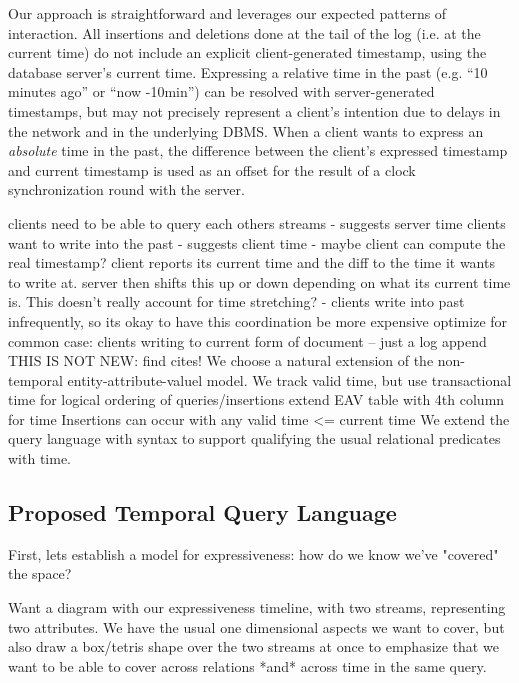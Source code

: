 Our approach is straightforward and leverages our expected patterns of interaction.
All insertions and deletions done at the tail of the log (i.e. at the current time)
do not include an explicit client-generated timestamp, using the database server's current
time. Expressing a relative time in the past (e.g. ``10 minutes ago'' or ``now -10min'')
can be resolved with server-generated timestamps, but may not precisely represent
a client's intention due to delays in the network and in the underlying DBMS. 
When a client wants to express an \emph{absolute} time in the past, the difference
between the client's expressed timestamp and current timestamp is used as an offset
for the result of a clock synchronization round with the server.

clients need to be able to query each others streams
    - suggests server time
clients want to write into the past
    - suggests client time
    - maybe client can compute the real timestamp?
        client reports its current time and the diff to the time it wants to write at.
        server then shifts this up or down depending on what its current time is.
        This doesn't really account for time stretching?
    - clients write into past infrequently, so its okay to have this coordination be more expensive
optimize for common case: clients writing to current form of document -- just a log append
\fi
{}
THIS IS NOT NEW: find cites!
We choose a natural extension of the non-temporal entity-attribute-valuel model.
We track valid time, but use transactional time for logical ordering of queries/insertions
extend EAV table with 4th column for time
Insertions can occur with any valid time <= current time
We extend the query language with syntax to support qualifying the usual
relational predicates with time. 
\fi

\subsection{Proposed Temporal Query Language}

First, lets establish a model for expressiveness: how do we know we've "covered" the space?

Want a diagram with our expressiveness timeline, with two streams, representing two attributes. We
have the usual one dimensional aspects we want to cover, but also draw a box/tetris shape over
the two streams at once to emphasize that we want to be able to cover across relations *and* across
time in the same query.
\fi

